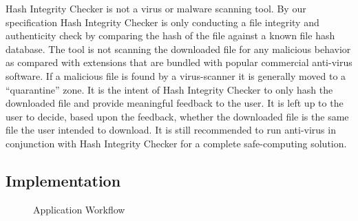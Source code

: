 \documentclass[letterpaper,twocolumn,10pt]{article}
\begin{document}
Hash Integrity Checker is not a virus or malware scanning tool. By our specification Hash Integrity Checker is only conducting a file integrity and authenticity check by comparing the hash of the file against a known file hash database. The tool is not scanning the downloaded file for any malicious behavior as compared with extensions that are bundled with popular commercial anti-virus software. If a malicious file is found by a virus-scanner it is generally moved to a “quarantine” zone. It is the intent of Hash Integrity Checker to only hash the downloaded file and provide meaningful feedback to the user. It is left up to the user to decide, based upon the feedback, whether the downloaded file is the same file the user intended to download. It is still recommended to run anti-virus in conjunction with Hash Integrity Checker for a complete safe-computing solution.

\subsection{Implementation}

\begin{figure}
    \centering
    \caption{Application Workflow}
    \label{fig:appflow}
\end{figure}
\end{document}
